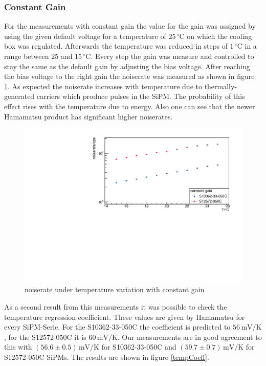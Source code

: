 \subsubsection{Constant Gain}
For the measurements with constant gain the value for the gain was assigned by using the given default voltage for a temperature of $25\,\mathrm{^{\circ}C}$ on which the cooling box was regulated. Afterwards the temperature was reduced in steps of $1\,\mathrm{^{\circ}C}$ in a range between $25$ and $15\,\mathrm{^{\circ}C}$. Every step the gain was measure and controlled to stay the same as the default gain by adjusting the bias voltage. After reaching the bias voltage to the right gain the noiserate was measured as shown in figure \ref{constGain_rate}.
As expected the noiserate increases with temperature due to thermally-generated carriers which produce pulses in the SiPM. The probability of this effect rises with the temperature due to energy. Also one can see that the newer Hamamatsu product has significant higher noiserates.
\begin{figure}[h]
	\centering
	\includegraphics[width = 0.75 \textwidth]{Figures/radermacher/constGain_Rate.pdf}
	\caption{noiserate under temperature variation with constant gain}
	\label{constGain_rate}
\end{figure}
As a second result from this measurements it was possible to check the temperature regression coefficient. These values are given by Hamamatsu for every SiPM-Serie. For the S10362-33-050C the coefficient is predicted to $56\,\mathrm{mV/K}$, for the S12572-050C it is $60\,\mathrm{mV/K}$. Our measurements are in good agreement to this with $(56.6 \pm 0.5)\,\mathrm{mV/K}$ for S10362-33-050C and $(59.7 \pm 0.7)\,\mathrm{mV/K}$ for S12572-050C SiPMs. The results are shown in figure \ref{tempCoeff}. 
